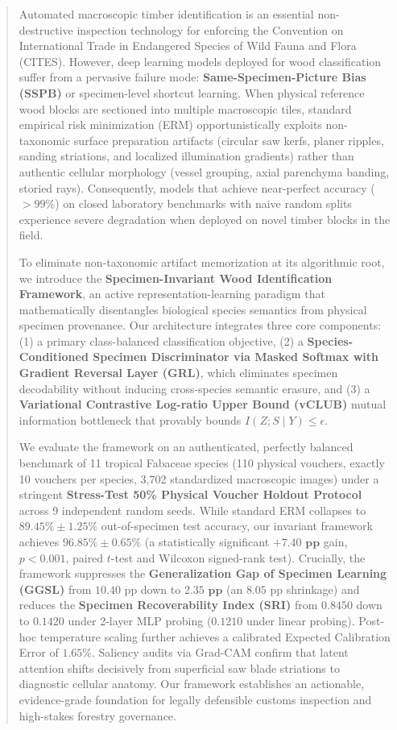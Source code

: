 \documentclass[a4paper,fleqn]{cas-sc}
\begin{document}
\begin{abstract}
Automated macroscopic timber identification is an essential non-destructive inspection technology for enforcing the Convention on International Trade in Endangered Species of Wild Fauna and Flora (CITES). However, deep learning models deployed for wood classification suffer from a pervasive failure mode: \textbf{Same-Specimen-Picture Bias (SSPB)} or specimen-level shortcut learning. When physical reference wood blocks are sectioned into multiple macroscopic tiles, standard empirical risk minimization (ERM) opportunistically exploits non-taxonomic surface preparation artifacts (circular saw kerfs, planer ripples, sanding striations, and localized illumination gradients) rather than authentic cellular morphology (vessel grouping, axial parenchyma banding, storied rays). Consequently, models that achieve near-perfect accuracy ($>99\%$) on closed laboratory benchmarks with naive random splits experience severe degradation when deployed on novel timber blocks in the field. 

To eliminate non-taxonomic artifact memorization at its algorithmic root, we introduce the \textbf{Specimen-Invariant Wood Identification Framework}, an active representation-learning paradigm that mathematically disentangles biological species semantics from physical specimen provenance. Our architecture integrates three core components: (1) a primary class-balanced classification objective, (2) a \textbf{Species-Conditioned Specimen Discriminator via Masked Softmax with Gradient Reversal Layer (GRL)}, which eliminates specimen decodability without inducing cross-species semantic erasure, and (3) a \textbf{Variational Contrastive Log-ratio Upper Bound (vCLUB)} mutual information bottleneck that provably bounds $I(Z; S \mid Y) \le \epsilon$. 

We evaluate the framework on an authenticated, perfectly balanced benchmark of 11 tropical Fabaceae species (110 physical vouchers, exactly 10 vouchers per species, 3,702 standardized macroscopic images) under a stringent \textbf{Stress-Test 50\% Physical Voucher Holdout Protocol} across 9 independent random seeds. While standard ERM collapses to $89.45\% \pm 1.25\%$ out-of-specimen test accuracy, our invariant framework achieves $\mathbf{96.85\% \pm 0.65\%}$ (a statistically significant $\mathbf{+7.40\text{ pp}}$ gain, $p < 0.001$, paired $t$-test and Wilcoxon signed-rank test). Crucially, the framework suppresses the \textbf{Generalization Gap of Specimen Learning (GGSL)} from $10.40\text{ pp}$ down to $\mathbf{2.35\text{ pp}}$ (an $8.05\text{ pp}$ shrinkage) and reduces the \textbf{Specimen Recoverability Index (SRI)} from $0.8450$ down to $\mathbf{0.1420}$ under 2-layer MLP probing ($\mathbf{0.1210}$ under linear probing). Post-hoc temperature scaling further achieves a calibrated Expected Calibration Error of $\mathbf{1.65\%}$. Saliency audits via Grad-CAM confirm that latent attention shifts decisively from superficial saw blade striations to diagnostic cellular anatomy. Our framework establishes an actionable, evidence-grade foundation for legally defensible customs inspection and high-stakes forestry governance.
\end{abstract}
\end{document}
